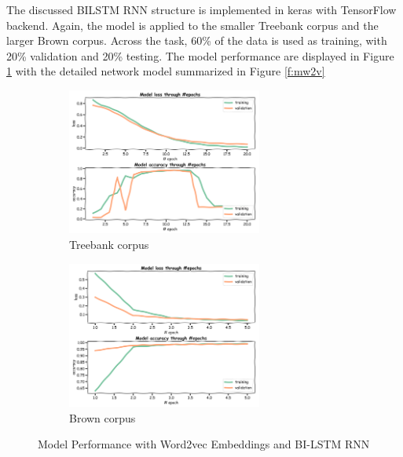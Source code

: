 \documentclass[11pt]{article}
\theoremstyle{plain}
\begin{document}
The discussed BILSTM RNN structure is implemented in keras with 
TensorFlow backend. Again, the model is applied to the smaller Treebank 
corpus and the larger Brown corpus. Across the task, 60\% of the data is 
used as training, with 20\% validation and 20\% testing. The model 
performance are displayed in Figure \ref{f:mpw2v} with the detailed network 
model summarized in Figure \ref{f:mw2v}
\begin{figure}[!ht]
	\centering
	\begin{subfigure}[b]{0.5\textwidth}
		\includegraphics[height=1.9in]{images/model-performance-lstm-tree.png}
		\caption{Treebank corpus}
	\end{subfigure}%
	\begin{subfigure}[b]{0.5\textwidth}
		\includegraphics[height=1.9in]{images/model-performance-lstm-brown.png}
		\caption{Brown corpus}
	\end{subfigure}
	\caption{Model Performance with Word2vec Embeddings and BI-LSTM 
	RNN}\label{f:mpw2v}
\end{figure}
\end{document}
